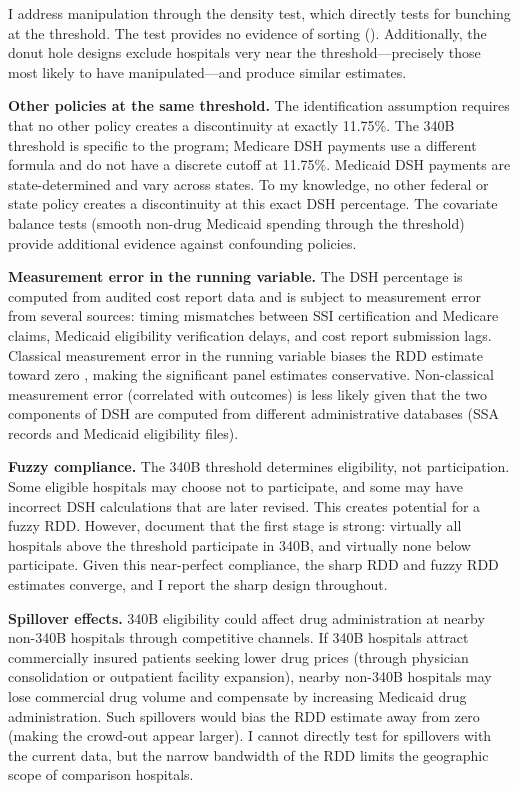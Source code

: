 \documentclass[12pt]{article}
\begin{document}
I address manipulation through the \citet{cattaneo2020simple} density test, which directly tests for bunching at the threshold. The test provides no evidence of sorting (). Additionally, the donut hole designs exclude hospitals very near the threshold---precisely those most likely to have manipulated---and produce similar estimates.

\textbf{Other policies at the same threshold.} The identification assumption requires that no other policy creates a discontinuity at exactly 11.75\%. The 340B threshold is specific to the program; Medicare DSH payments use a different formula and do not have a discrete cutoff at 11.75\%. Medicaid DSH payments are state-determined and vary across states. To my knowledge, no other federal or state policy creates a discontinuity at this exact DSH percentage. The covariate balance tests (smooth non-drug Medicaid spending through the threshold) provide additional evidence against confounding policies.

\textbf{Measurement error in the running variable.} The DSH percentage is computed from audited cost report data and is subject to measurement error from several sources: timing mismatches between SSI certification and Medicare claims, Medicaid eligibility verification delays, and cost report submission lags. Classical measurement error in the running variable biases the RDD estimate toward zero \citep{lee2008randomized}, making the significant panel estimates conservative. Non-classical measurement error (correlated with outcomes) is less likely given that the two components of DSH are computed from different administrative databases (SSA records and Medicaid eligibility files).

\textbf{Fuzzy compliance.} The 340B threshold determines eligibility, not participation. Some eligible hospitals may choose not to participate, and some may have incorrect DSH calculations that are later revised. This creates potential for a fuzzy RDD. However, \citet{nikpay2018effect} document that the first stage is strong: virtually all hospitals above the threshold participate in 340B, and virtually none below participate. Given this near-perfect compliance, the sharp RDD and fuzzy RDD estimates converge, and I report the sharp design throughout.

\textbf{Spillover effects.} 340B eligibility could affect drug administration at nearby non-340B hospitals through competitive channels. If 340B hospitals attract commercially insured patients seeking lower drug prices (through physician consolidation or outpatient facility expansion), nearby non-340B hospitals may lose commercial drug volume and compensate by increasing Medicaid drug administration. Such spillovers would bias the RDD estimate away from zero (making the crowd-out appear larger). I cannot directly test for spillovers with the current data, but the narrow bandwidth of the RDD limits the geographic scope of comparison hospitals.
\end{document}
